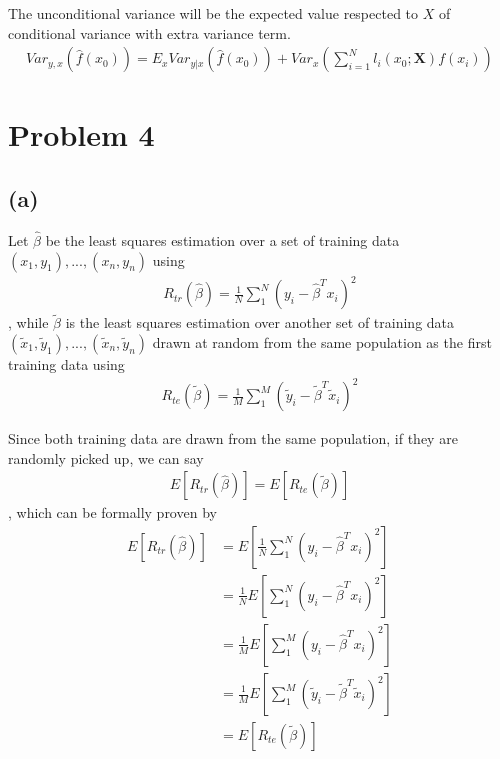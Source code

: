 \documentclass[pra,groupedaddress,amsmath,amssymb, column]{revtex4}
\begin{document}
The unconditional variance will be the expected value respected to $X$ of conditional variance with extra variance term.
\begin{align}
Var_{y,x}(\hat{f}(x_0)) = E_xVar_{y|x}(\hat{f}(x_0))+Var_x\left(\sum_{i=1}^{N}l_i(x_0; \mathbf{X})f(x_i) \right)\nonumber
\end{align}



\section*{Problem 4}
\subsection*{(a)}
Let $\hat{\beta}$ be the least squares estimation over a set of training data $(x_1,y_1),...,(x_n,y_n)$ using
\begin{align}
R_{tr}(\hat{\beta}) = \frac{1}{N}\sum_{1}^N(y_i - \hat{\beta}^Tx_i)^2
\end{align}, while $\tilde{\beta}$ is the least squares estimation over another set of training data $(\tilde{x}_1,\tilde{y}_1),...,(\tilde{x}_n,\tilde{y}_n)$ drawn at random from the same population as the first training data using
\begin{align}
R_{te}(\tilde{\beta}) = \frac{1}{M}\sum_{1}^M(\tilde{y}_i - \tilde{\beta}^T\tilde{x}_i)^2
\end{align}

Since both training data are drawn from the same population, if they are randomly  picked up, we can say
\begin{align}
E[R_{tr}(\hat{\beta})] = E[R_{te}(\tilde{\beta}) ]\label{4equal}
\end{align}, which can be formally proven by
\begin{align}
E[R_{tr}(\hat{\beta})] &= E[ \frac{1}{N}\sum_{1}^N({y}_i - \hat{\beta}^T{x}_i)^2 ]\nonumber\\
&= \frac{1}{N}E[\sum_{1}^N({y}_i - \hat{\beta}^T{x}_i)^2 ]\nonumber\\
&=  \frac{1}{M}E[\sum_{1}^M({y}_i - \hat{\beta}^T{x}_i)^2 ]\nonumber\\
&=  \frac{1}{M}E[\sum_{1}^M(\tilde{y}_i - \tilde{\beta}^T\tilde{x}_i)^2 ]\nonumber\\
&=E[R_{te}(\tilde{\beta}) ]
\end{align}
\end{document}
